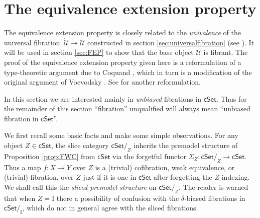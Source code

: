 \documentclass[11pt]{amsart}
\newcommand{\cSet}{\ensuremath{\mathsf{cSet}}}
\newcommand{\fib}{\ensuremath{\twoheadrightarrow}}
\renewcommand{\to}{\ensuremath{\rightarrow}}
\newcommand{\I}{\ensuremath{\mathrm{I}}}
\newcommand{\U}{\ensuremath{\mathcal{U}}}
\newcommand{\UU}{\ensuremath{\,\dot{\mathcal{U}}}}
\theoremstyle{remark}
\theoremstyle{definition}
\begin{document}
\section{The equivalence extension property}\label{sec:EEP}

The equivalence extension property is closely related to the \emph{univalence} of the universal fibration $\UU\fib\U$ constructed in section \ref{sec:universalfibration} (see \cite{Shu2015}).  It will be used in section \ref{sec:FEP} to show that the base object $\U$ is fibrant.  The proof of the equivalence extension property given here is a reformulation of a type-theoretic argument due to Coquand \cite{CCHM}, which in turn is a modification of the original argument of Voevodsky \cite{KLV}.  See \cite{sattler} for another reformulation.  

In this section we are interested mainly in \emph{unbiased} fibrations in $\cSet$. 
Thus for the remainder of this section ``fibration'' unqualified will always mean ``unbiased fibration in $\cSet$''.  

We first recall some basic facts and make some simple observations. 
For any object $Z \in\cSet$, the slice category $\cSet/_Z$ inherits the premodel structure of Proposition \ref{prop:FWC} from $\cSet$ via the forgetful functor $\Sigma_Z : \cSet/_Z \to \cSet$.  Thus a map $f : X \to Y$ over $Z$ is a (trivial) cofibration, weak equivalence, or (trivial) fibration, over $Z$ just if it is one in $\cSet$ after forgetting the $Z$-indexing. We shall call this the \emph{sliced premodel structure} on $\cSet/_Z$.  The reader is warned that when $Z = \I$ there a possibility of confusion with the $\delta$-biased fibrations in $\cSet/_\I$, which do not in general agree with the sliced fibrations.  
\end{document}

